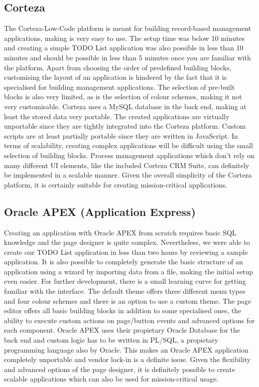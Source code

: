 \documentclass[runningheads]{llncs}
\begin{document}
\subsection{Corteza}

The Corteza-Low-Code platform is meant for building record-based management applications, making is very easy to use. The setup time was below 10 minutes and creating a simple TODO List application was also possible in less than 10 minutes and should be possible in less than 5 minutes once you are familiar with the platform. Apart from choosing the order of predefined building blocks, customising the layout of an application is hindered by the fact that it is specialised for building management applications. The selection of pre-built blocks is also very limited, as is the selection of colour schemes, making it not very customisable. Corteza uses a MySQL database in the back end, making at least the stored data very portable. The created applications are virtually unportable since they are tightly integrated into the Corteza platform. Custom scripts are at least partially portable since they are written in JavaScript. In terms of scalability, creating complex applications will be difficult using the small selection of building blocks. Process management applications which don't rely on many different UI elements, like the included Corteza CRM Suite, can definitely be implemented in a scalable manner. Given the overall simplicity of the Corteza platform, it is certainly suitable for creating mission-critical applications.

\subsection{Oracle APEX (Application Express)}

Creating an application with Oracle APEX from scratch requires basic SQL knowledge and the page designer is quite complex. Nevertheless, we were able to create our TODO List application in less than two hours by reviewing a sample application. It is also possible to completely generate the basic structure of an application using a wizard by importing data from a file, making the initial setup even easier. For further development, there is a small learning curve for getting familiar with the interface. The default theme offers three different menu types and four colour schemes and there is an option to use a custom theme. The page editor offers all basic building blocks in addition to some specialised ones, the ability to execute custom actions on page/button events and advanced options for each component. Oracle APEX uses their propietary Oracle Database for the back end and custom logic has to be written in PL/SQL, a propietary programming language also by Oracle. This makes an Oracle APEX application completely unportable and vendor lock-in is a definite issue. Given the flexibility and advanced options of the page designer, it is definitely possible to create scalable applications which can also be used for mission-critical usage.
\end{document}
